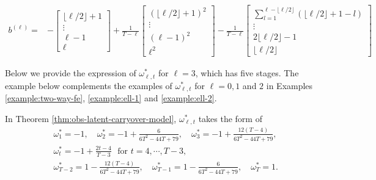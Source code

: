 		\begin{align}
		    b^{(\ell)} =& - \begin{bmatrix}
		\lfloor \ell/2 \rfloor+1 \\ \vdots \\ \ell - 1 \\ \ell
		\end{bmatrix}  + \frac{1}{T - \ell} \begin{bmatrix}
		(\lfloor \ell/2 \rfloor+1)^2  \\ \vdots \\  (\ell-1)^2 \\  \ell^2
		\end{bmatrix} - \frac{1}{T - \ell} \begin{bmatrix} 
		\sum_{l = 1}^{\ell - \lfloor \ell/2 \rfloor} (\lfloor \ell/2 \rfloor  + 1 - l) \\
		\vdots \\  2 \lfloor \ell/2 \rfloor - 1\\  \lfloor \ell/2 \rfloor
		\end{bmatrix} \label{eqn:b-ell}
		\end{align}
		
		Below we provide the expression of $\omega_{\ell,t}^\ast$ for $\ell = 3$, which has five stages. The example below complements the examples of $\omega_{\ell,t}^\ast$ for $\ell = 0, 1$ and $2$ in Examples \ref{example:two-way-fe}, \ref{example:ell-1} and \ref{example:ell-2}.
		
		\begin{example}[$\ell = 3$]\label{remark:carryover-example-l3}
		In Theorem \ref{thm:obs-latent-carryover-model}, $\omega^\ast_{\ell,t}$ takes the form of
			\begin{eqnarray*}
				&& \omega_1^\ast = -1, \quad \omega_2^\ast = -1 + \frac{6}{6T^2 - 44T + 79}, \quad \omega_3^\ast = -1 + \frac{12(T-4)}{6T^2 - 44T + 79}, \\
				&& \omega_t^\ast = -1 + \frac{2t-4}{T-3} \,\, \text{ for } t = 4, \cdots, T-3, \\
				&& \omega_{T-2}^\ast = 1 - \frac{12(T-4)}{6T^2 - 44T + 79}, \quad \omega_{T-1}^\ast = 1- \frac{6}{6T^2 - 44T + 79}, \quad \omega_T^\ast = 1.
			\end{eqnarray*} 
		\end{example}
	
